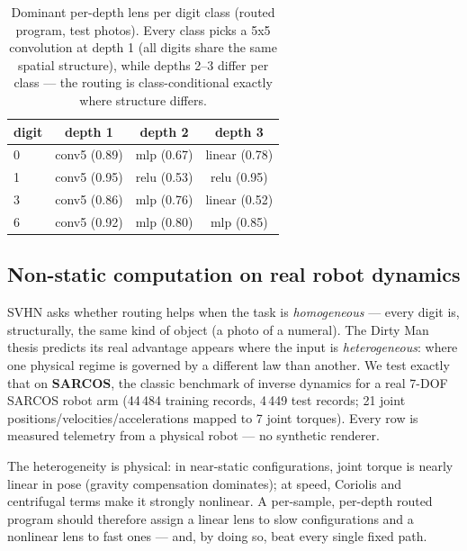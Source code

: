 \documentclass[11pt,a4paper]{article}
\begin{document}
\begin{table}[t]
  \centering
  \caption{Dominant per-depth lens per digit class (routed program, test
photos). Every class picks a 5x5 convolution at depth 1 (all digits share the
same spatial structure), while depths 2--3 differ per class --- the routing is
class-conditional exactly where structure differs.}
  \label{tab:programs}
  \begin{tabular}{lccc}
    \toprule
    digit & depth 1 & depth 2 & depth 3 \\
    \midrule
    0 & conv5 (0.89) & mlp (0.67) & linear (0.78) \\
    1 & conv5 (0.95) & relu (0.53) & relu (0.95) \\
    3 & conv5 (0.86) & mlp (0.76) & linear (0.52) \\
    6 & conv5 (0.92) & mlp (0.80) & mlp (0.85) \\
    \bottomrule
  \end{tabular}
\end{table}

\subsection{Non-static computation on real robot dynamics}
\label{sec:sarcos}

SVHN asks whether routing helps when the task is \emph{homogeneous} --- every
digit is, structurally, the same kind of object (a photo of a numeral). The
Dirty Man thesis predicts its real advantage appears where the input is
\emph{heterogeneous}: where one physical regime is governed by a different law
than another. We test exactly that on \textbf{SARCOS}, the classic benchmark of
inverse dynamics for a real 7-DOF SARCOS robot arm (44\,484 training records,
4\,449 test records; 21 joint positions/velocities/accelerations mapped to 7
joint torques). Every row is measured telemetry from a physical robot --- no
synthetic renderer.

The heterogeneity is physical: in near-static configurations, joint torque is
nearly linear in pose (gravity compensation dominates); at speed, Coriolis and
centrifugal terms make it strongly nonlinear. A per-sample, per-depth routed
program should therefore assign a linear lens to slow configurations and a
nonlinear lens to fast ones --- and, by doing so, beat every single fixed path.
\end{document}
